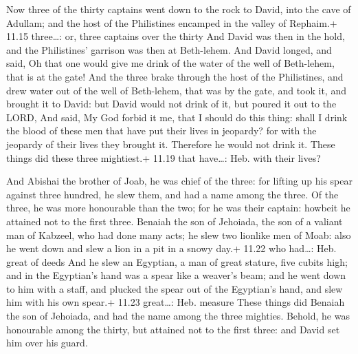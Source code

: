  Now three of the thirty captains went down to the rock
to David, into the cave of Adullam; and the host of the Philistines
encamped in the valley of Rephaim.+ 11.15 three\ldots: or, three
captains over the thirty  And David was then in the hold,
and the Philistines' garrison was then at Beth-lehem.  And
David longed, and said, Oh that one would give me drink of the water of
the well of Beth-lehem, that is at the gate!  And the three
brake through the host of the Philistines, and drew water out of the
well of Beth-lehem, that was by the gate, and took it, and brought it to
David: but David would not drink of it, but poured it out to the LORD,
 And said, My God forbid it me, that I should do this
thing: shall I drink the blood of these men that have put their lives in
jeopardy? for with the jeopardy of their lives they brought it.
Therefore he would not drink it. These things did these three
mightiest.+ 11.19 that have\ldots: Heb. with their lives?

 And Abishai the brother of Joab, he was chief of the
three: for lifting up his spear against three hundred, he slew them, and
had a name among the three.  Of the three, he was more
honourable than the two; for he was their captain: howbeit he attained
not to the first three.  Benaiah the son of Jehoiada, the
son of a valiant man of Kabzeel, who had done many acts; he slew two
lionlike men of Moab: also he went down and slew a lion in a pit in a
snowy day.+ 11.22 who had\ldots: Heb. great of deeds  And
he slew an Egyptian, a man of great stature, five cubits high; and in
the Egyptian's hand was a spear like a weaver's beam; and he went down
to him with a staff, and plucked the spear out of the Egyptian's hand,
and slew him with his own spear.+ 11.23 great\ldots: Heb. measure
 These things did Benaiah the son of Jehoiada, and had the
name among the three mighties.  Behold, he was honourable
among the thirty, but attained not to the first three: and David set him
over his guard.

